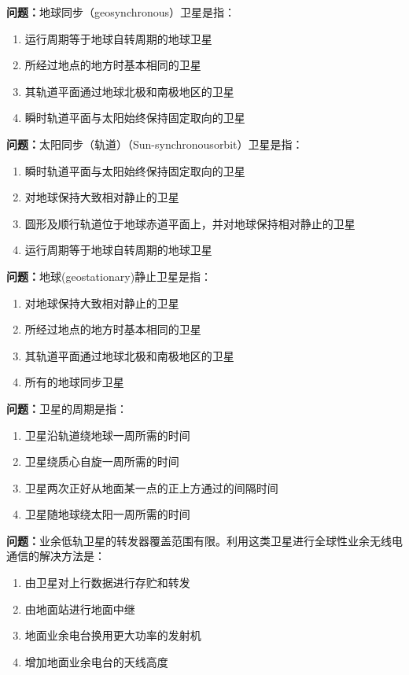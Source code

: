 \bigskip


\noindent\textbf{问题：}地球同步（geosynchronous）卫星是指：
\begin{enumerate}[label=\Alph*), leftmargin=3em]
\item 运行周期等于地球自转周期的地球卫星
\item 所经过地点的地方时基本相同的卫星
\item 其轨道平面通过地球北极和南极地区的卫星
\item 瞬时轨道平面与太阳始终保持固定取向的卫星
\end{enumerate}

\bigskip


\noindent\textbf{问题：}太阳同步（轨道）（Sun-synchronousorbit）卫星是指：
\begin{enumerate}[label=\Alph*), leftmargin=3em]
\item 瞬时轨道平面与太阳始终保持固定取向的卫星
\item 对地球保持大致相对静止的卫星
\item 圆形及顺行轨道位于地球赤道平面上，并对地球保持相对静止的卫星
\item 运行周期等于地球自转周期的地球卫星
\end{enumerate}

\bigskip


\noindent\textbf{问题：}地球(geostationary)静止卫星是指：
\begin{enumerate}[label=\Alph*), leftmargin=3em]
\item 对地球保持大致相对静止的卫星
\item 所经过地点的地方时基本相同的卫星
\item 其轨道平面通过地球北极和南极地区的卫星
\item 所有的地球同步卫星
\end{enumerate}

\bigskip


\noindent\textbf{问题：}卫星的周期是指：
\begin{enumerate}[label=\Alph*), leftmargin=3em]
\item 卫星沿轨道绕地球一周所需的时间
\item 卫星绕质心自旋一周所需的时间
\item 卫星两次正好从地面某一点的正上方通过的间隔时间
\item 卫星随地球绕太阳一周所需的时间
\end{enumerate}

\bigskip


\noindent\textbf{问题：}业余低轨卫星的转发器覆盖范围有限。利用这类卫星进行全球性业余无线电通信的解决方法是：
\begin{enumerate}[label=\Alph*), leftmargin=3em]
\item 由卫星对上行数据进行存贮和转发
\item 由地面站进行地面中继
\item 地面业余电台换用更大功率的发射机
\item 增加地面业余电台的天线高度
\end{enumerate}

